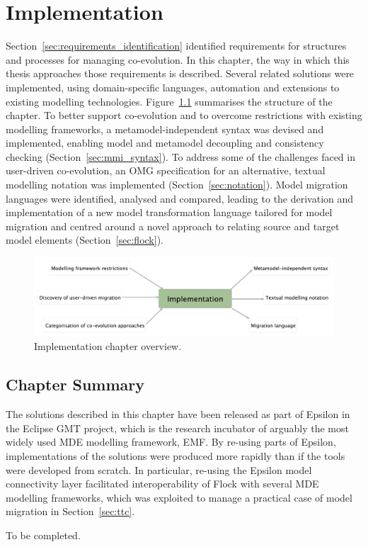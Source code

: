 
\chapter{Implementation}
\label{Implementation}
Section~\ref{sec:requirements_identification} identified requirements for structures and processes for managing co-evolution. In this chapter, the way in which this thesis approaches those requirements is described. Several related solutions were implemented, using domain-specific languages, automation and extensions to existing modelling technologies. Figure~\ref{fig:implementation_overview} summarises the structure of the chapter. To better support co-evolution and to overcome restrictions with existing modelling frameworks, a metamodel-independent syntax was devised and implemented, enabling model and metamodel decoupling and consistency checking (Section~\ref{sec:mmi_syntax}). To address some of the challenges faced in user-driven co-evolution, an OMG specification for an alternative, textual modelling notation was implemented (Section~\ref{sec:notation}). Model migration languages were identified, analysed and compared, leading to the derivation and implementation of a new model transformation language tailored for model migration and centred around a novel approach to relating source and target model elements (Section~\ref{sec:flock}). 

\begin{figure}[htbp]
  \begin{center}
    \leavevmode
    \includegraphics[width=12cm]{5.Implementation/overview.pdf}
  \end{center}
  \caption{Implementation chapter overview.}
  \label{fig:implementation_overview}
\end{figure}








\section{Chapter Summary}

The solutions described in this chapter have been released as part of Epsilon in the Eclipse GMT \cite{gmt} project, which is the research incubator of arguably the most widely used MDE modelling framework, EMF. By re-using parts of Epsilon, implementations of the solutions were produced more rapidly than if the tools were developed from scratch. In particular, re-using the Epsilon model connectivity layer facilitated interoperability of Flock with several MDE modelling frameworks, which was exploited to manage a practical case of model migration in Section~\ref{sec:ttc}.   

To be completed.
